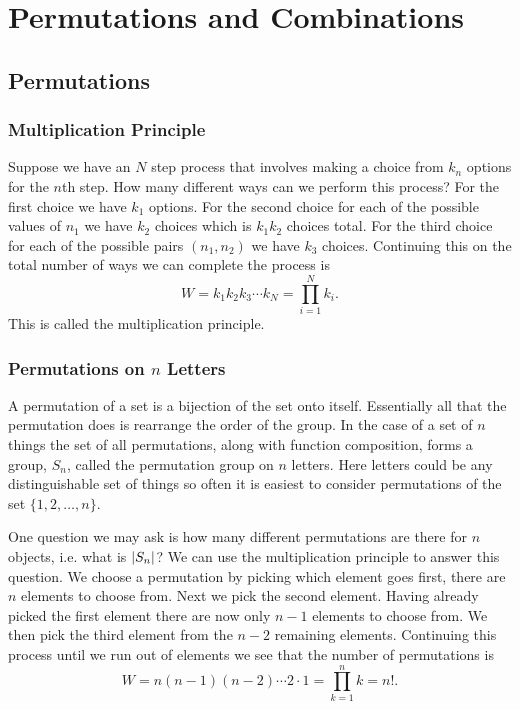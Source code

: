 \section{Permutations and Combinations}
    \subsection{Permutations}
    \subsubsection{Multiplication Principle}
    Suppose we have an \(N\) step process that involves making a choice from \(k_n\) options for the \(n\)th step.
    How many different ways can we perform this process?
    For the first choice we have \(k_1\) options.
    For the second choice for each of the possible values of \(n_1\) we have \(k_2\) choices which is \(k_1k_2\) choices total.
    For the third choice for each of the possible pairs \((n_1, n_2)\) we have \(k_3\) choices.
    Continuing this on the total number of ways we can complete the process is
    \[W = k_1k_2k_3\dotsm k_N = \prod_{i=1}^N k_i.\]
    This is called the multiplication principle.
    
    \subsubsection{Permutations on \texorpdfstring{\(n\)}{n} Letters}
    A permutation of a set is a bijection of the set onto itself.
    Essentially all that the permutation does is rearrange the order of the group.
    In the case of a set of \(n\) things the set of all permutations, along with function composition, forms a group, \(S_n\), called the permutation group on \(n\) letters.
    Here letters could be any distinguishable set of things so often it is easiest to consider permutations of the set \(\{1, 2, \dotsc, n\}\).
    
    One question we may ask is how many different permutations are there for \(n\) objects, i.e. what is \(\abs{S_n}\)?
    We can use the multiplication principle to answer this question.
    We choose a permutation by picking which element goes first, there are \(n\) elements to choose from.
    Next we pick the second element.
    Having already picked the first element there are now only \(n - 1\) elements to choose from.
    We then pick the third element from the \(n - 2\) remaining elements.
    Continuing this process until we run out of elements we see that the number of permutations is
    \[W = n(n-1)(n-2)\dotsm 2\cdot 1 = \prod_{k=1}^n k = n!.\]
    
